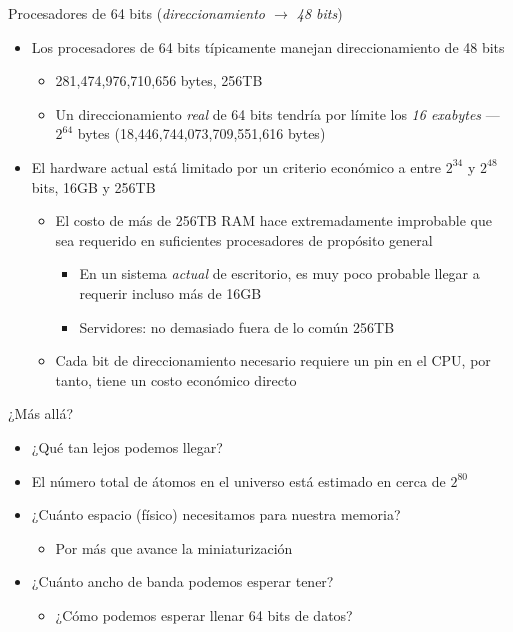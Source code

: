 \documentclass[presentation]{beamer}
\begin{document}
\begin{frame}[label={sec:org5ca8dc4}]{Procesadores de 64 bits (\emph{direccionamiento \(\rightarrow\) 48 bits})}
\begin{itemize}
\item Los procesadores de 64 bits típicamente manejan direccionamiento de
48 bits
\begin{itemize}
\item 281,474,976,710,656 bytes, 256TB
\item Un direccionamiento \emph{real} de 64 bits tendría por límite los \emph{16
exabytes} — \(2^{64}\) bytes (18,446,744,073,709,551,616 bytes)
\end{itemize}
\item El hardware actual está limitado por un criterio económico a entre
\(2^{34}\) y \(2^{48}\) bits, 16GB y 256TB
\begin{itemize}
\item El costo de más de 256TB RAM hace extremadamente improbable que
sea requerido en suficientes procesadores de propósito general
\begin{itemize}
\item En un sistema \emph{actual} de escritorio, es muy poco probable
llegar a requerir incluso más de 16GB
\item Servidores: no demasiado fuera de lo común 256TB
\end{itemize}
\item Cada bit de direccionamiento necesario requiere un pin en el CPU,
por tanto, tiene un costo económico directo
\end{itemize}
\end{itemize}
\end{frame}

\begin{frame}[label={sec:org69695a5}]{¿Más allá?}
\begin{itemize}
\item ¿Qué tan lejos podemos llegar?
\item El número total de átomos en el universo está estimado en cerca de
\(2^{80}\)
\item ¿Cuánto espacio (físico) necesitamos para nuestra memoria?
\begin{itemize}
\item Por más que avance la miniaturización
\end{itemize}
\item ¿Cuánto ancho de banda podemos esperar tener?
\begin{itemize}
\item ¿Cómo podemos esperar llenar 64 bits de datos?
\end{itemize}
\end{itemize}
\end{frame}
\end{document}
